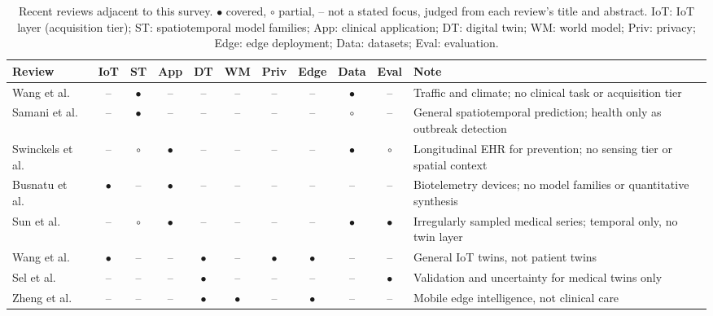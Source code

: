 \documentclass[journal]{IEEEtran}
\newif\ifsubmission
\begin{document}
\begin{table}[t]
\centering
\caption{Recent reviews adjacent to this survey. $\bullet$ covered, $\circ$ partial, -- not a stated focus, judged from each review's title and abstract. IoT: IoT layer (acquisition tier); ST: spatiotemporal model families; App: clinical application; DT: digital twin; WM: world model; Priv: privacy; Edge: edge deployment; Data: datasets; Eval: evaluation.}
\label{tab:related-surveys}
\ifsubmission
\scriptsize
\setlength{\tabcolsep}{4pt}
\renewcommand{\arraystretch}{1.08}
\begin{tabularx}{\textwidth}{>{\raggedright\arraybackslash}p{2.7cm} c c c c c c c c c >{\raggedright\arraybackslash}X}
\toprule
\textbf{Review} & \textbf{IoT} & \textbf{ST} & \textbf{App} & \textbf{DT} & \textbf{WM} & \textbf{Priv} & \textbf{Edge} & \textbf{Data} & \textbf{Eval} & \textbf{Note} \\
\midrule
Wang et al.~\cite{wang2022deep} & -- & $\bullet$ & -- & -- & -- & -- & -- & $\bullet$ & -- & Traffic and climate; no clinical task or acquisition tier \\
\addlinespace[1pt]
Samani et al.~\cite{samani2026stdl} & -- & $\bullet$ & -- & -- & -- & -- & -- & $\circ$ & -- & General spatiotemporal prediction; health only as outbreak detection \\
\addlinespace[1pt]
Swinckels et al.~\cite{swinckels2024ehr} & -- & $\circ$ & $\bullet$ & -- & -- & -- & -- & $\bullet$ & $\circ$ & Longitudinal EHR for prevention; no sensing tier or spatial context \\
\addlinespace[1pt]
Busnatu et al.~\cite{Busnatu2022} & $\bullet$ & -- & $\bullet$ & -- & -- & -- & -- & -- & -- & Biotelemetry devices; no model families or quantitative synthesis \\
\addlinespace[1pt]
Sun et al.~\cite{sun2026irregularmedical} & -- & $\circ$ & $\bullet$ & -- & -- & -- & -- & $\bullet$ & $\bullet$ & Irregularly sampled medical series; temporal only, no twin layer \\
\addlinespace[1pt]
Wang et al.~\cite{Wang2023Survey} & $\bullet$ & -- & -- & $\bullet$ & -- & $\bullet$ & $\bullet$ & -- & -- & General IoT twins, not patient twins \\
\addlinespace[1pt]
Sel et al.~\cite{Sel2025VVUQ} & -- & -- & -- & $\bullet$ & -- & -- & -- & -- & $\bullet$ & Validation and uncertainty for medical twins only \\
\addlinespace[1pt]
Zheng et al.~\cite{Zheng2026DTtoWM} & -- & -- & -- & $\bullet$ & $\bullet$ & -- & $\bullet$ & -- & -- & Mobile edge intelligence, not clinical care \\

\end{tabularx}
\end{table}
\end{document}
